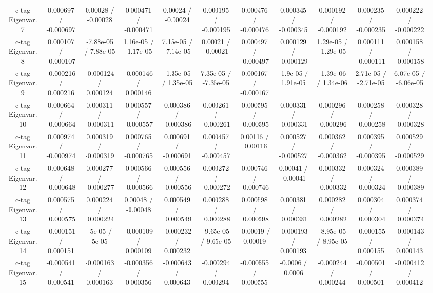 \begin{table}[htbp]
\begin{center}
\begin{tabular}{|c|c|c|c|c|c|c|c|c|c|c|}
  c-tag Eigenvar. 7 & 0.000697 / -0.000697 & 0.00028 / -0.00028 & 0.000471 / -0.000471 & 0.00024 / -0.00024 & 0.000195 / -0.000195 & 0.000476 / -0.000476 & 0.000345 / -0.000345 & 0.000192 / -0.000192 & 0.000235 / -0.000235 & 0.000222 / -0.000222 \\ 
  c-tag Eigenvar. 8 & 0.000107 / -0.000107 & -7.88e-05 / 7.88e-05 & 1.16e-05 / -1.17e-05 & 7.15e-05 / -7.14e-05 & 0.00021 / -0.00021 & 0.000497 / -0.000497 & 0.000129 / -0.000129 & 1.29e-05 / -1.29e-05 & 0.000111 / -0.000111 & 0.000158 / -0.000158 \\ 
  c-tag Eigenvar. 9 & -0.000216 / 0.000216 & -0.000124 / 0.000124 & -0.000146 / 0.000146 & -1.35e-05 / 1.35e-05 & 7.35e-05 / -7.35e-05 & 0.000167 / -0.000167 & -1.9e-05 / 1.91e-05 & -1.39e-06 / 1.34e-06 & 2.71e-05 / -2.71e-05 & 6.07e-05 / -6.06e-05 \\ 
  c-tag Eigenvar. 10 & 0.000664 / -0.000664 & 0.000311 / -0.000311 & 0.000557 / -0.000557 & 0.000386 / -0.000386 & 0.000261 / -0.000261 & 0.000595 / -0.000595 & 0.000331 / -0.000331 & 0.000296 / -0.000296 & 0.000258 / -0.000258 & 0.000328 / -0.000328 \\ 
  c-tag Eigenvar. 11 & 0.000974 / -0.000974 & 0.000319 / -0.000319 & 0.000765 / -0.000765 & 0.000691 / -0.000691 & 0.000457 / -0.000457 & 0.00116 / -0.00116 & 0.000527 / -0.000527 & 0.000362 / -0.000362 & 0.000395 / -0.000395 & 0.000529 / -0.000529 \\ 
  c-tag Eigenvar. 12 & 0.000648 / -0.000648 & 0.000277 / -0.000277 & 0.000566 / -0.000566 & 0.000556 / -0.000556 & 0.000272 / -0.000272 & 0.000746 / -0.000746 & 0.00041 / -0.00041 & 0.000332 / -0.000332 & 0.000324 / -0.000324 & 0.000389 / -0.000389 \\ 
  c-tag Eigenvar. 13 & 0.000575 / -0.000575 & 0.000224 / -0.000224 & 0.00048 / -0.00048 & 0.000549 / -0.000549 & 0.000288 / -0.000288 & 0.000598 / -0.000598 & 0.000381 / -0.000381 & 0.000282 / -0.000282 & 0.000304 / -0.000304 & 0.000374 / -0.000374 \\ 
  c-tag Eigenvar. 14 & -0.000151 / 0.000151 & -5e-05 / 5e-05 & -0.000109 / 0.000109 & -0.000232 / 0.000232 & -9.65e-05 / 9.65e-05 & -0.00019 / 0.00019 & -0.000193 / 0.000193 & -8.95e-05 / 8.95e-05 & -0.000155 / 0.000155 & -0.000143 / 0.000143 \\ 
  c-tag Eigenvar. 15 & -0.000541 / 0.000541 & -0.000163 / 0.000163 & -0.000356 / 0.000356 & -0.000643 / 0.000643 & -0.000294 / 0.000294 & -0.000555 / 0.000555 & -0.0006 / 0.0006 & -0.000244 / 0.000244 & -0.000501 / 0.000501 & -0.000412 / 0.000412 \\ 

\end{tabular}
\end{center}
\end{table}
